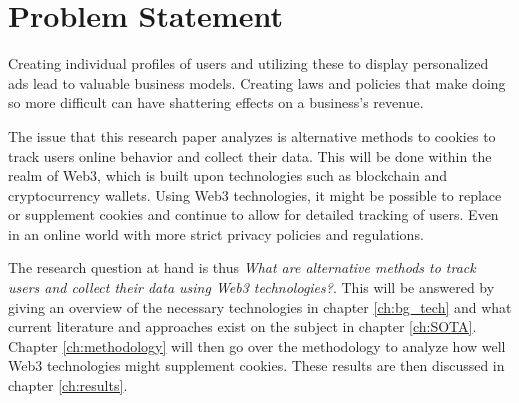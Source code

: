 \chapter{Problem Statement}
\label{ch:problem}

Creating individual profiles of users and utilizing these to display personalized ads lead to valuable business models. Creating laws and policies that make doing so more difficult can have shattering effects on a business's revenue.

The issue that this research paper analyzes is alternative methods to cookies to track users online behavior and collect their data. This will be done within the realm of Web3, which is built upon technologies such as blockchain and cryptocurrency wallets. Using Web3 technologies, it might be possible to replace or supplement cookies and continue to allow for detailed tracking of users. Even in an online world with more strict privacy policies and regulations.

The research question at hand is thus \textit{What are alternative methods to track users and collect their data using Web3 technologies?}. This will be answered by giving an overview of the necessary technologies in chapter \ref{ch:bg_tech} and what current literature and approaches exist on the subject in chapter \ref{ch:SOTA}. Chapter \ref{ch:methodology} will then go over the methodology to analyze how well Web3 technologies might supplement cookies. These results are then discussed in chapter \ref{ch:results}.